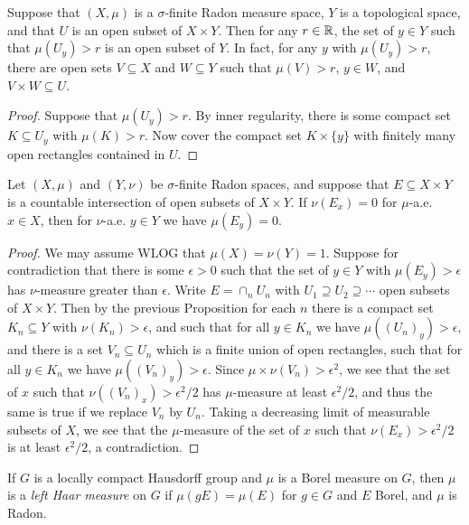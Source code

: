 \begin{prop}\label{radon-product-open} Suppose that $(X,\mu)$ is a $\sigma$-finite Radon measure space, $Y$ is a topological space, and that $U$ is an open subset of $X \times Y$. Then for any $r \in \mathbb{R}$, the set of $y \in Y$ such that $\mu(U_y) > r$ is an open subset of $Y$. In fact, for any $y$ with $\mu(U_y) > r$, there are open sets $V \subseteq X$ and $W \subseteq Y$ such that $\mu(V) > r$, $y \in W$, and $V\times W \subseteq U$.
\end{prop}
\begin{proof} Suppose that $\mu(U_y) > r$. By inner regularity, there is some compact set $K \subseteq U_y$ with $\mu(K) > r$. Now cover the compact set $K\times \{y\}$ with finitely many open rectangles contained in $U$.
\end{proof}

\begin{lem}\label{weak-fubini-radon} Let $(X,\mu)$ and $(Y,\nu)$ be $\sigma$-finite Radon spaces, and suppose that $E \subseteq X\times Y$ is a countable intersection of open subsets of $X\times Y$. If $\nu(E_x) = 0$ for $\mu$-a.e. $x \in X$, then for $\nu$-a.e. $y \in Y$ we have $\mu(E_y) = 0$.
\end{lem}
\begin{proof} We may assume WLOG that $\mu(X) = \nu(Y) = 1$. Suppose for contradiction that there is some $\epsilon > 0$ such that the set of $y \in Y$ with $\mu(E_y) > \epsilon$ has $\nu$-measure greater than $\epsilon$. Write $E = \cap_n U_n$ with $U_1 \supseteq U_2 \supseteq \cdots$ open subsets of $X\times Y$. Then by the previous Proposition for each $n$ there is a compact set $K_n \subseteq Y$ with $\nu(K_n) > \epsilon$, and such that for all $y \in K_n$ we have $\mu((U_n)_y) > \epsilon$, and there is a set $V_n \subseteq U_n$ which is a finite union of open rectangles, such that for all $y \in K_n$ we have $\mu((V_n)_y) > \epsilon$. Since $\mu\times\nu(V_n) > \epsilon^2$, we see that the set of $x$ such that $\nu((V_n)_x) > \epsilon^2/2$ has $\mu$-measure at least $\epsilon^2/2$, and thus the same is true if we replace $V_n$ by $U_n$. Taking a decreasing limit of measurable subsets of $X$, we see that the $\mu$-measure of the set of $x$ such that $\nu(E_x) > \epsilon^2/2$ is at least $\epsilon^2/2$, a contradiction.
\end{proof}

\begin{defn} If $G$ is a locally compact Hausdorff group and $\mu$ is a Borel measure on $G$, then $\mu$ is a \emph{left Haar measure} on $G$ if $\mu(gE) = \mu(E)$ for $g \in G$ and $E$ Borel, and $\mu$ is Radon.
\end{defn}

